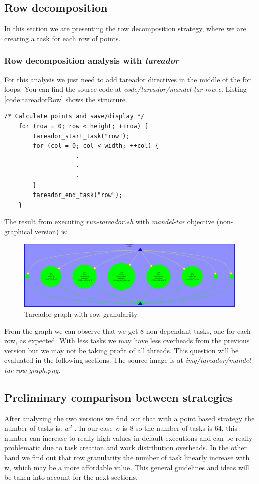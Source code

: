 \documentclass{article}
\begin{document}
\newpage
\subsection{Row decomposition}
\label{sec:rowAnalysis}
In this section we are presenting the row decomposition strategy, where we are creating a task for each row of points. 
\subsubsection*{Row decomposition analysis with \textit{tareador}}
For this analysis we just need to add tareador directives in the middle of the for loops. You can find the source code at \textit{code/tareador/mandel-tar-row.c}. Listing \ref{code:tareadorRow} shows the structure.

\begin{lstlisting}[caption={Tareador instrumentation at row granularity},label=code:tareadorRow]
    /* Calculate points and save/display */
    for (row = 0; row < height; ++row) {
        tareador_start_task("row");
        for (col = 0; col < width; ++col) {
                    .
                    .
                    .
        }
        tareador_end_task("row");       
    }
\end{lstlisting}
\justify
The result from executing \textit{run-tareador.sh} with \textit{mandel-tar} objective (non-graphical version) is:
\begin{figure}[h]
    \centering
    \includegraphics[width=0.99\textwidth]{mandel-tar-row-graph.png}
    \caption{Tareador graph with row granularity}
    \label{fig:tareadorrow}
\end{figure}

\justify
From the graph we can observe that we get 8 non-dependant tasks, one for each row, as expected. With less tasks we may have less overheads from the previous version but we may not be taking profit of all threads. This question will be evaluated in the following sections. The source image is at \textit{img/tareador/mandel-tar-row-graph.png}. 

\newpage
\subsection{Preliminary comparison between strategies}
\justify
After analyzing the two versions we find out that with a point based strategy the number of tasks is: $w^2$ . In our case w is 8 so the number of tasks is 64, this number can increase to really high values in default executions and can be really problematic due to task creation and work distribution overheads. In the other hand we find out that row granularity the number of task linearly increase with w, which may be a more affordable value. This general guidelines and ideas will be taken into account for the next sections.
\end{document}
